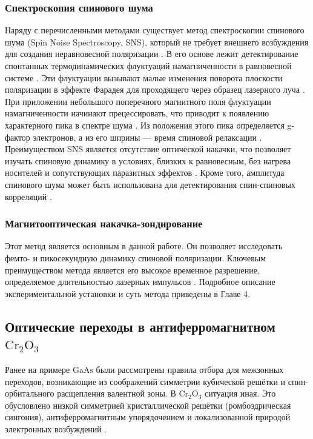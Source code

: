 \documentclass[14pt]{extarticle}
\newcommand{\crome}{\mathrm{Cr}_{2}\mathrm{O}_{3}}
\newcommand{\gaas}{\mathrm{Ga}\mathrm{As}}
\numberwithin{equation}{section}
\begin{document}
\subsubsection{Спектроскопия спинового шума}

Наряду с перечисленными методами существует метод спектроскопии спинового шума (Spin Noise Spectroscopy, SNS), который не требует внешнего возбуждения для создания неравновесной поляризации \cite{Romer2007}. В его основе лежит детектирование спонтанных термодинамических флуктуаций намагниченности в равновесной системе  \cite{Romer2007, Crooker2004}. Эти флуктуации вызывают малые изменения поворота плоскости поляризации в эффекте Фарадея для проходящего через образец лазерного луча \cite{Crooker2004}. При приложении небольшого поперечного магнитного поля флуктуации намагниченности начинают прецессировать, что приводит к появлению характерного пика в спектре шума \cite{Crooker2004}. Из положения этого пика определяется g-фактор электронов, а из его ширины — время спиновой релаксации \cite{Osterreich2005}. Преимуществом SNS является отсутствие оптической накачки, что позволяет изучать спиновую динамику в условиях, близких к равновесным, без нагрева носителей и сопутствующих паразитных эффектов \cite{Romer2007}. Кроме того, амплитуда спинового шума может быть использована для детектирования спин-спиновых корреляций \cite{Romer2007}.

\subsubsection{Магнитооптическая накачка-зондирование}

Этот метод является основным в данной работе. Он позволяет исследовать фемто- и пикосекундную динамику спиновой поляризации. Ключевым преимуществом метода является его высокое временное разрешение, определяемое длительностью лазерных импульсов \cite{Kirilyuk_Kimel}. Подробное описание экспериментальной установки и суть метода приведены в Главе 4.


\subsection{Оптические переходы в антиферромагнитном $\crome$}

Ранее на примере $\gaas$ были  рассмотрены правила отбора для межзонных переходов, возникающие из соображений симметрии кубической решётки и спин-орбитального расщепления валентной зоны. В  $\crome$ ситуация иная. Это обусловлено низкой симметрией кристаллической решётки (ромбоэдрическая сингония), антиферромагнитным упорядочением и локализованной природой электронных возбуждений \cite{Allen1969, Pavlov, Loudon1968}.
\end{document}
